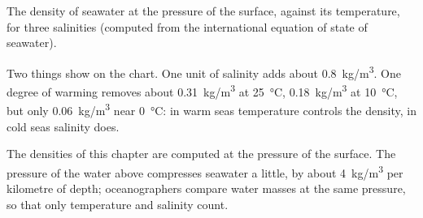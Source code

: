 \begin{omfigure}

{\small The density of seawater at the pressure of the surface, against its
temperature, for three salinities (computed from the international equation
of state of seawater).}
\end{omfigure}

Two things show on the chart. One unit of salinity adds about
\qty{0.8}{kg/m^3}. One degree of warming removes about \qty{0.31}{kg/m^3}
at \qty{25}{\degreeCelsius}, \qty{0.18}{kg/m^3} at \qty{10}{\degreeCelsius},
but only \qty{0.06}{kg/m^3} near \qty{0}{\degreeCelsius}: in warm seas
temperature controls the density, in cold seas salinity does.

\begin{remark}
The densities of this chapter are computed at the pressure of the surface.
The pressure of the water above compresses seawater a little, by about
\qty{4}{kg/m^3} per kilometre of depth; oceanographers compare water masses
at the same pressure, so that only temperature and salinity count.
\end{remark}

